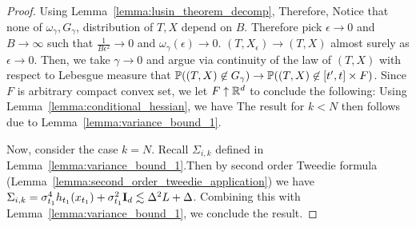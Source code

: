 \begin{proof}
Using Lemma~\ref{lemma:lusin_theorem_decomp},
Therefore, 
Notice that none of $\omega_{\gamma}, G_{\gamma}$, distribution of $T,X$ depend on $B$. Therefore pick $\epsilon \to 0$ and $B \to \infty$ such that $\frac{1}{B\epsilon^{2}} \to 0$ and $\omega_{\gamma}(\epsilon) \to 0$. $(T,X_{\epsilon}) \to (T,X)$ almost surely as $\epsilon \to 0$. Then, we take $\gamma\to 0$ and argue via continuity of the law of $(T,X)$ with respect to Lebesgue measure that $\mathbb{P}((T,X) \not\in G_{\gamma}) \to \mathbb{P}((T,X)\not\in [t',t]\times F)$. Since $F$ is arbitrary compact convex set, we let $F \uparrow \mathbb{R}^d$ to conclude the following: 
Using Lemma~\ref{lemma:conditional_hessian}, we have
The result for $k < N$ then follows due to Lemma~\ref{lemma:variance_bound_1}.

Now, consider the case $k = N$. Recall $\Sigma_{i,k}$ defined in Lemma~\ref{lemma:variance_bound_1}.Then by second order Tweedie formula (Lemma~\ref{lemma:second_order_tweedie_application}) we have $\Sigma_{i,k} = \sigma_{t_1}^4 h_{t_1}(x_{t_1}) + \sigma_{t_1}^2 \mathbf{I}_d \lesssim \Delta^2L + \Delta$. Combining this with Lemma~\ref{lemma:variance_bound_1}, we conclude the result.
\end{proof}

